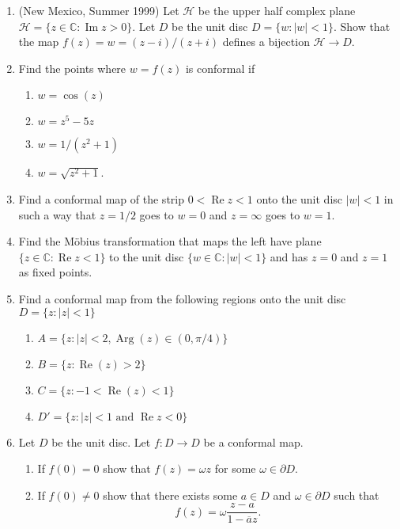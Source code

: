 \documentclass[a4paper,10pt]{article}
\newcommand{\CC}{\mathbb{C}}
\newcommand{\Arg}{\operatorname{Arg}}
\renewcommand{\Re}{\operatorname{Re}}
\renewcommand{\Im}{\operatorname{Im}}
\begin{document}
\begin{enumerate}
\item (New Mexico, Summer 1999)
Let $\mathcal{H}$ be the upper half complex plane $\mathcal{H} = \lbrace z \in \CC : \Im z > 0 \rbrace$.
Let $D$ be the unit disc $D = \lbrace w : \vert w \vert < 1 \rbrace$. 
Show that the map $f(z) = w = (z-i)/(z+i)$ defines a bijection $\mathcal{H} \to D$.
	
	
\item Find the points where $w = f(z)$ is conformal if 
\begin{enumerate}
	\item $w = \cos(z)$
	\item $w = z^5 - 5z$
	\item $w = 1/(z^2+1)$
	\item $w = \sqrt{z^2+1}$.
\end{enumerate}

\item Find a conformal map of the strip $0 < \Re z < 1$ onto the unit disc $\vert w \vert < 1$ in such a way that $z=1/2 $ goes to $ w=0$ and $z = \infty$ goes to $w=1$.

\item Find the M\"obius transformation that maps the left have plane $\lbrace z \in \CC: \Re z < 1 \rbrace$ to the unit disc $\lbrace w \in \CC : \vert w \vert < 1 \rbrace$ and has $z=0$ and $z=1$ as fixed points.

\item Find a conformal map from the following regions onto the unit disc $D = \lbrace z : \vert z \vert < 1 \rbrace$
\begin{enumerate}
	\item $A = \lbrace z: \vert z \vert < 2,  \Arg(z) \in (0,\pi/4) \rbrace $
	\item $B = \lbrace z: \Re(z) >2\rbrace $
	\item $C = \lbrace z: -1<\Re(z)<1 \rbrace$
	\item $D' = \lbrace z: \vert z \vert < 1 \mbox{ and } \Re z < 0\rbrace $ 
\end{enumerate}

\item Let $D$ be the unit disc. Let $f: D \to D$ be a conformal map. 
\begin{enumerate}
	\item If $f(0) = 0$ show that $f(z) = \omega z$ for some $\omega \in \partial D$. 
	\item If $f(0) \neq 0$ show that there exists some $a \in D$ and $\omega \in \partial D$ such that 
	$$ f(z) = \omega \frac{z - a}{1 - \overline{a} z}.$$
\end{enumerate}


\end{enumerate}
\end{document}
